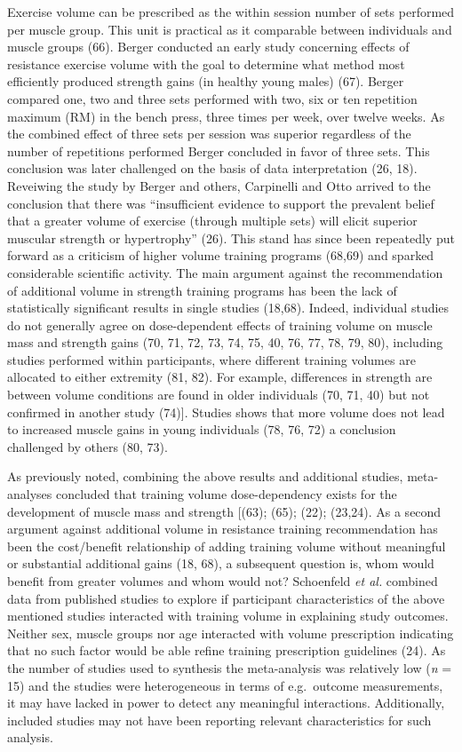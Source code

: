 \documentclass[twoside,10pt]{gihclass} %
\begin{document}
Exercise volume can be prescribed as the within session number of sets performed per muscle group. This unit is practical as it comparable between individuals and muscle groups (66).
Berger conducted an early study concerning effects of resistance exercise volume with the goal to determine what method most efficiently produced strength gains (in healthy young males) (67). Berger compared one, two and three sets performed with two, six or ten repetition maximum (RM) in the bench press, three times per week, over twelve weeks. As the combined effect of three sets per session was superior regardless of the number of repetitions performed Berger concluded in favor of three sets. This conclusion was later challenged on the basis of data interpretation
(26, 18).
Reveiwing the study by Berger and others, Carpinelli and Otto arrived to the conclusion that there was ``insufficient evidence to support the prevalent belief that a greater volume of exercise (through multiple sets) will elicit superior muscular strength or hypertrophy'' (26). This stand has since been repeatedly put forward as a criticism of higher volume training programs
(68,69) and sparked considerable scientific activity. The main argument against the recommendation of additional volume in strength training programs has been the lack of statistically significant results in single studies (18,68).
Indeed, individual studies do not generally agree on dose-dependent effects of training volume on muscle mass and strength gains
(70, 71, 72, 73, 74, 75, 40, 76, 77, 78, 79, 80),
including studies performed within participants, where different training volumes are allocated to either extremity
(81, 82).
For example, differences in strength are between volume conditions are found in older individuals
(70, 71, 40)
but not confirmed in another study
(74){]}.
Studies shows that more volume does not lead to increased muscle gains in young individuals
(78, 76, 72)
a conclusion challenged by others
(80, 73).

As previously noted, combining the above results and additional studies, meta-analyses concluded that training volume dose-dependency exists for the development of muscle mass and strength
{[}(63);
(65);
(22);
(23,24).
As a second argument against additional volume in resistance training recommendation has been the cost/benefit relationship of adding training volume without meaningful or substantial additional gains
(18, 68),
a subsequent question is, whom would benefit from greater volumes and whom would not?
Schoenfeld \emph{et al.} combined data from published studies to explore if participant characteristics of the above mentioned studies interacted with training volume in explaining study outcomes. Neither sex, muscle groups nor age interacted with volume prescription indicating that no such factor would be able refine training prescription guidelines
(24).
As the number of studies used to synthesis the meta-analysis was relatively low (\emph{n} = 15) and the studies were heterogeneous in terms of e.g.~outcome measurements, it may have lacked in power to detect any meaningful interactions. Additionally, included studies may not have been reporting relevant characteristics for such analysis.
\end{document}

